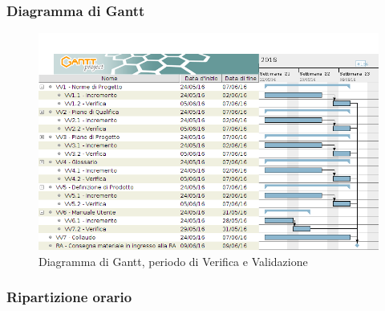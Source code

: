\subsubsection{Diagramma di Gantt}
\begin{figure}[ht!]
  \includegraphics[width=1\textwidth]{res/img/pianificazione/VerificaEValidazione.png}
  \caption{Diagramma di Gantt, periodo di Verifica e Validazione}
\end{figure}

\subsubsection{Ripartizione orario}

